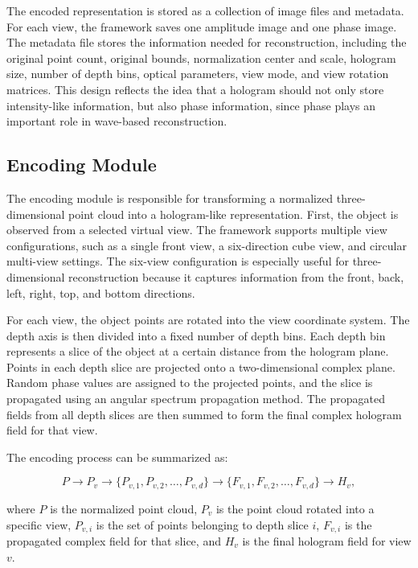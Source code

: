 \documentclass{article}
\begin{document}
\begin{normalsize}
The encoded representation is stored as a collection of image files and metadata. For each view, the framework saves one amplitude image and one phase image. The metadata file stores the information needed for reconstruction, including the original point count, original bounds, normalization center and scale, hologram size, number of depth bins, optical parameters, view mode, and view rotation matrices. This design reflects the idea that a hologram should not only store intensity-like information, but also phase information, since phase plays an important role in wave-based reconstruction.

\subsection{Encoding Module}

The encoding module is responsible for transforming a normalized three-dimensional point cloud into a hologram-like representation. First, the object is observed from a selected virtual view. The framework supports multiple view configurations, such as a single front view, a six-direction cube view, and circular multi-view settings. The six-view configuration is especially useful for three-dimensional reconstruction because it captures information from the front, back, left, right, top, and bottom directions.

For each view, the object points are rotated into the view coordinate system. The depth axis is then divided into a fixed number of depth bins. Each depth bin represents a slice of the object at a certain distance from the hologram plane. Points in each depth slice are projected onto a two-dimensional complex plane. Random phase values are assigned to the projected points, and the slice is propagated using an angular spectrum propagation method. The propagated fields from all depth slices are then summed to form the final complex hologram field for that view.

The encoding process can be summarized as:

\[
P \rightarrow P_v \rightarrow \{P_{v,1}, P_{v,2}, \ldots, P_{v,d}\}
\rightarrow
\{F_{v,1}, F_{v,2}, \ldots, F_{v,d}\}
\rightarrow
H_v,
\]

where \(P\) is the normalized point cloud, \(P_v\) is the point cloud rotated into a specific view, \(P_{v,i}\) is the set of points belonging to depth slice \(i\), \(F_{v,i}\) is the propagated complex field for that slice, and \(H_v\) is the final hologram field for view \(v\).


\end{normalsize}
\end{document}
